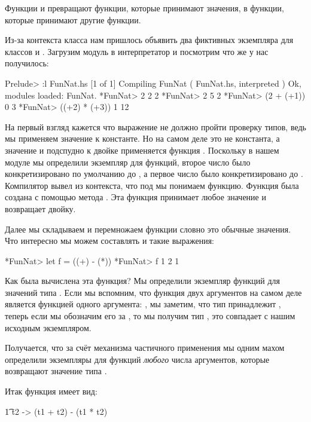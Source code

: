 Функции  и  превращают функции, которые принимают
значения, в функции, которые принимают другие функции.

Из-за контекста класса  нам пришлось объявить два фиктивных
экземпляра для классов  и . Загрузим модуль 
в интерпретатор и посмотрим что же у нас получилось:


\begin{code}
Prelude> :l FunNat.hs
[1 of 1] Compiling FunNat           ( FunNat.hs, interpreted )
Ok, modules loaded: FunNat.
*FunNat> 2 2
2
*FunNat> 2 5
2
*FunNat> (2 + (+1)) 0 
3
*FunNat> ((+2) * (+3)) 1
12
\end{code}

На первый взгляд кажется что выражение  не должно пройти
проверку типов, ведь мы применяем значение к константе. Но на самом деле
 это не константа, а значение  и подспудно к
двойке применяется функция . Поскольку в нашем модуле мы
определили экземпляр  для функций, второе число  было
конкретизировано по умолчанию до , а первое число 
было конкретизировано до . Компилятор вывел из
контекста, что под  мы понимаем функцию. Функция была создана с
помощью метода . Эта функция принимает любое значение и
возвращает двойку.

Далее мы складываем и перемножаем функции словно это обычные значения.
Что интересно мы можем составлять и такие выражения:


\begin{code}
*FunNat> let f = ((+) - (*))
*FunNat> f 1 2
1
\end{code}

Как была вычислена эта функция? Мы определили экземпляр функций для
значений типа . Если мы вспомним, что функция двух
аргументов на самом деле является функцией одного аргумента:
, мы заметим, что тип
 принадлежит , теперь если мы обозначим
его за , то мы получим тип , это совпадает
с нашим исходным экземпляром.

Получается, что за счёт механизма частичного применения мы одним махом
определили экземпляры  для функций \emph{любого} числа
аргументов, которые возвращают значение типа .

Итак функция  имеет вид:


\begin{code}
\t1 t2 -> (t1 + t2) - (t1 * t2)
\end{code}

